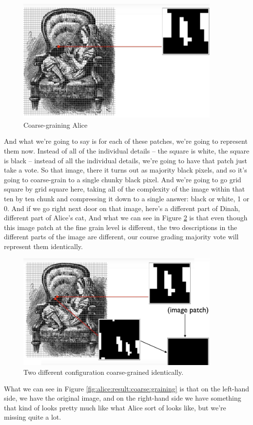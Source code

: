 \documentclass[]{article}
\begin{document}
\begin{figure}[H]
	\caption{Coarse-graining Alice}\label{fig:alice:coarse}
	\includegraphics[width=0.9\textwidth]{Alice2}
\end{figure}
And what we're going to say
is for each of these patches,
we're going to represent them now.
Instead of all of the individual details –
the square is white, the square is black –
instead of all the individual details,
we're going to have that patch
just take a vote.
So that image, there it turns out
as majority black pixels,
and so it's going to coarse-grain
to a single chunky black pixel.
And we're going to go
grid square by grid square here,
taking all of the complexity
of the image within that ten by ten chunk
and compressing it down
to a single answer:
black or white, 1 or 0.
And if we go right next door
on that image,
here's a different part of Dinah,
different part of Alice's cat,
And what we can see in Figure \ref{fig:alice:voting}
is that even though this image patch
at the fine grain level is different,
the two descriptions in the different
parts of the image are different,
our course grading majority vote
will represent them identically.

\begin{figure}[H]
	\caption{Two different configuration coarse-grained identically.}\label{fig:alice:voting}
	\includegraphics[width=0.9\textwidth]{Alice3}
\end{figure}
What we can see in Figure \ref{fig:alice:result:coarse:graining} is that on the left-hand side, we have the original image, and on the right-hand side
we have something that kind of looks pretty much like what
Alice sort of looks like, but we're missing quite a lot.
\end{document}

